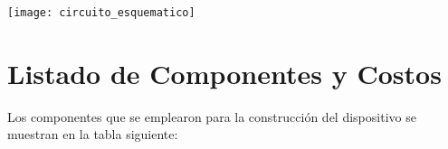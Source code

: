 \hspace{-1.8cm}
\texttt{[image: circuito\_esquematico]}



\pagebreak
\section{Listado de Componentes y Costos}
Los componentes que se emplearon para la construcción del dispositivo se muestran en la tabla siguiente:

